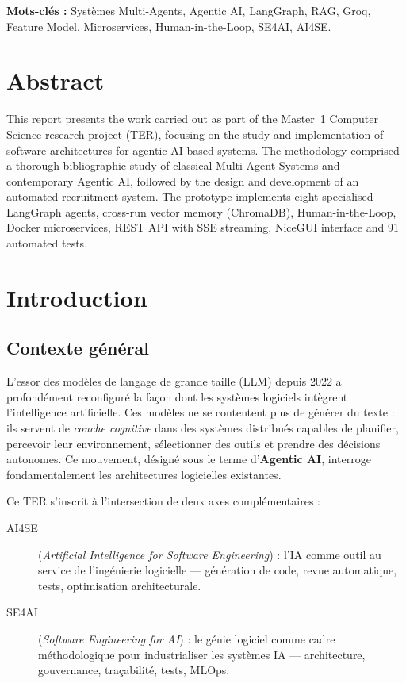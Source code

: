 \documentclass[12pt,a4paper]{report}
\begin{document}
\medskip
\textbf{Mots-clés :} Systèmes Multi-Agents, Agentic AI, LangGraph, RAG, Groq,
Feature Model, Microservices, Human-in-the-Loop, SE4AI, AI4SE.

\chapter*{Abstract}

This report presents the work carried out as part of the Master~1 Computer Science
research project (TER), focusing on the study and implementation of software
architectures for agentic AI-based systems. The methodology comprised a thorough
bibliographic study of classical Multi-Agent Systems and contemporary Agentic AI,
followed by the design and development of an automated recruitment system. The
prototype implements eight specialised LangGraph agents, cross-run vector memory
(ChromaDB), Human-in-the-Loop, Docker microservices, REST API with SSE streaming,
NiceGUI interface and 91 automated tests.

\tableofcontents
\listoffigures
\listoftables

\chapter{Introduction}
\label{chap:intro}

\section{Contexte général}

L'essor des modèles de langage de grande taille (LLM) depuis 2022 a profondément
reconfiguré la façon dont les systèmes logiciels intègrent l'intelligence artificielle.
Ces modèles ne se contentent plus de générer du texte : ils servent de \textit{couche
cognitive} dans des systèmes distribués capables de planifier, percevoir leur
environnement, sélectionner des outils et prendre des décisions autonomes. Ce mouvement,
désigné sous le terme d'\textbf{Agentic AI}, interroge fondamentalement les architectures
logicielles existantes.

Ce TER s'inscrit à l'intersection de deux axes complémentaires :

\begin{description}
  \item[AI4SE] (\textit{Artificial Intelligence for Software Engineering}) : l'IA
        comme outil au service de l'ingénierie logicielle --- génération de code,
        revue automatique, tests, optimisation architecturale.
  \item[SE4AI] (\textit{Software Engineering for AI}) : le génie logiciel comme
        cadre méthodologique pour industrialiser les systèmes IA --- architecture,
        gouvernance, traçabilité, tests, MLOps.
\end{description}
\end{document}

